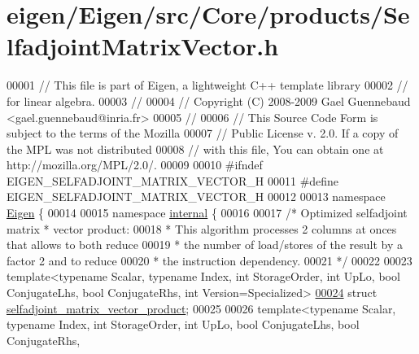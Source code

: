 \hypertarget{eigen_2_eigen_2src_2_core_2products_2_selfadjoint_matrix_vector_8h_source}{}\section{eigen/\+Eigen/src/\+Core/products/\+Selfadjoint\+Matrix\+Vector.h}
\label{eigen_2_eigen_2src_2_core_2products_2_selfadjoint_matrix_vector_8h_source}

\begin{DoxyCode}
00001 \textcolor{comment}{// This file is part of Eigen, a lightweight C++ template library}
00002 \textcolor{comment}{// for linear algebra.}
00003 \textcolor{comment}{//}
00004 \textcolor{comment}{// Copyright (C) 2008-2009 Gael Guennebaud <gael.guennebaud@inria.fr>}
00005 \textcolor{comment}{//}
00006 \textcolor{comment}{// This Source Code Form is subject to the terms of the Mozilla}
00007 \textcolor{comment}{// Public License v. 2.0. If a copy of the MPL was not distributed}
00008 \textcolor{comment}{// with this file, You can obtain one at http://mozilla.org/MPL/2.0/.}
00009 
00010 \textcolor{preprocessor}{#ifndef EIGEN\_SELFADJOINT\_MATRIX\_VECTOR\_H}
00011 \textcolor{preprocessor}{#define EIGEN\_SELFADJOINT\_MATRIX\_VECTOR\_H}
00012 
00013 \textcolor{keyword}{namespace }\hyperlink{namespace_eigen}{Eigen} \{ 
00014 
00015 \textcolor{keyword}{namespace }\hyperlink{namespaceinternal}{internal} \{
00016 
00017 \textcolor{comment}{/* Optimized selfadjoint matrix * vector product:}
00018 \textcolor{comment}{ * This algorithm processes 2 columns at onces that allows to both reduce}
00019 \textcolor{comment}{ * the number of load/stores of the result by a factor 2 and to reduce}
00020 \textcolor{comment}{ * the instruction dependency.}
00021 \textcolor{comment}{ */}
00022 
00023 \textcolor{keyword}{template}<\textcolor{keyword}{typename} Scalar, \textcolor{keyword}{typename} Index, \textcolor{keywordtype}{int} StorageOrder, \textcolor{keywordtype}{int} UpLo, \textcolor{keywordtype}{bool} ConjugateLhs, \textcolor{keywordtype}{bool} ConjugateRhs,
       \textcolor{keywordtype}{int} Version=Specialized>
\hyperlink{struct_eigen_1_1internal_1_1selfadjoint__matrix__vector__product}{00024} \textcolor{keyword}{struct }\hyperlink{struct_eigen_1_1internal_1_1selfadjoint__matrix__vector__product}{selfadjoint\_matrix\_vector\_product};
00025 
00026 \textcolor{keyword}{template}<\textcolor{keyword}{typename} Scalar, \textcolor{keyword}{typename} Index, \textcolor{keywordtype}{int} StorageOrder, \textcolor{keywordtype}{int} UpLo, \textcolor{keywordtype}{bool} ConjugateLhs, \textcolor{keywordtype}{bool} ConjugateRhs,

\end{DoxyCode}
